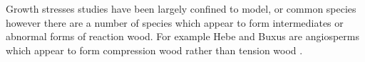 Growth stresses studies have been largely confined to model, or common species
however there are a number of species which appear to form intermediates or
abnormal forms of reaction wood. For example Hebe and Buxus are angiosperms which appear
to form compression wood rather than tension wood \citep{Kojima_2011,Yoshizawa_1992}.